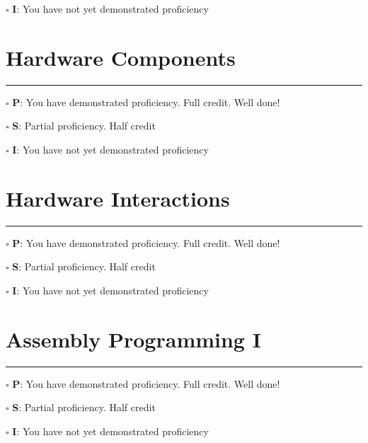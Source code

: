 \documentclass[12pt]{article}
\begin{document}
$\square$ \textbf{I}: You have not yet demonstrated proficiency

\newpage



\section*{Hardware Components}

\vfill

\rule[1ex]{\textwidth}{.1pt}

$\square$ \textbf{P}: You have demonstrated proficiency. Full credit. Well done!

$\square$ \textbf{S}: Partial proficiency. Half credit

$\square$ \textbf{I}: You have not yet demonstrated proficiency

\newpage



\section*{Hardware Interactions}

\vfill

\rule[1ex]{\textwidth}{.1pt}

$\square$ \textbf{P}: You have demonstrated proficiency. Full credit. Well done!

$\square$ \textbf{S}: Partial proficiency. Half credit

$\square$ \textbf{I}: You have not yet demonstrated proficiency

\newpage



\section*{Assembly Programming I}

\vfill

\rule[1ex]{\textwidth}{.1pt}

$\square$ \textbf{P}: You have demonstrated proficiency. Full credit. Well done!

$\square$ \textbf{S}: Partial proficiency. Half credit

$\square$ \textbf{I}: You have not yet demonstrated proficiency

\newpage
\end{document}
